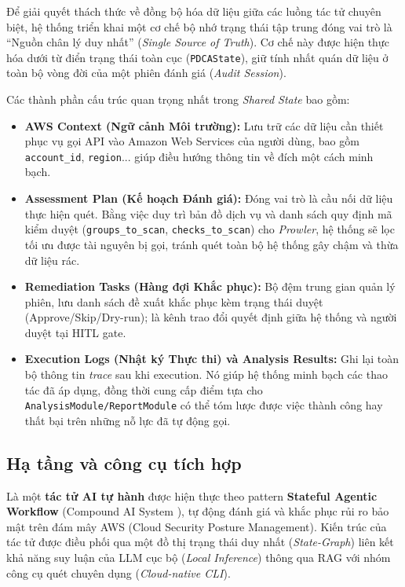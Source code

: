 Để giải quyết thách thức về đồng bộ hóa dữ liệu giữa các luồng tác tử chuyên biệt, hệ thống triển khai một cơ chế bộ nhớ trạng thái tập trung đóng vai trò là ``Nguồn chân lý duy nhất'' (\textit{Single Source of Truth}). Cơ chế này được hiện thực hóa dưới từ điển trạng thái toàn cục (\texttt{PDCAState}), giữ tính nhất quán dữ liệu ở toàn bộ vòng đời của một phiên đánh giá (\textit{Audit Session}).

Các thành phần cấu trúc quan trọng nhất trong \textit{Shared State} bao gồm:

\begin{itemize}
  \item \textbf{AWS Context (Ngữ cảnh Môi trường):} Lưu trữ các dữ liệu cần thiết phục vụ gọi API vào Amazon Web Services của người dùng, bao gồm \texttt{account\_id}, \texttt{region}... giúp điều hướng thông tin về đích một cách minh bạch.
  
  \item \textbf{Assessment Plan (Kế hoạch Đánh giá):} Đóng vai trò là cầu nối dữ liệu thực hiện quét. Bằng việc duy trì bản đồ dịch vụ và danh sách quy định mã kiểm duyệt (\texttt{groups\_to\_scan}, \texttt{checks\_to\_scan}) cho \textit{Prowler}, hệ thống sẽ lọc tối ưu được tài nguyên bị gọi, tránh quét toàn bộ hệ thống gây chậm và thừa dữ liệu rác.

  \item \textbf{Remediation Tasks (Hàng đợi Khắc phục):} Bộ đệm trung gian quản lý phiên, lưu danh sách đề xuất khắc phục kèm trạng thái duyệt (Approve/Skip/Dry-run); là kênh trao đổi quyết định giữa hệ thống và người duyệt tại HITL gate.

  \item \textbf{Execution Logs (Nhật ký Thực thi) và Analysis Results:} Ghi lại toàn bộ thông tin \textit{trace} sau khi execution. Nó giúp hệ thống minh bạch các thao tác đã áp dụng, đồng thời cung cấp điểm tựa cho \texttt{AnalysisModule/ReportModule} có thể tóm lược được việc thành công hay thất bại trên những nỗ lực đã tự động gọi.
\end{itemize}

\subsection{Hạ tầng và công cụ tích hợp}

Là một \textbf{tác tử AI tự hành} được hiện thực theo pattern \textbf{Stateful Agentic Workflow} (Compound AI System \cite{zaharia_compound_2024}), \sysnameshort{} tự động đánh giá và khắc phục rủi ro bảo mật trên đám mây AWS (Cloud Security Posture Management). Kiến trúc của tác tử được điều phối qua một đồ thị trạng thái duy nhất (\textit{State-Graph}) liên kết khả năng suy luận của LLM cục bộ (\textit{Local Inference}) thông qua RAG với nhóm công cụ quét chuyên dụng (\textit{Cloud-native CLI}).

